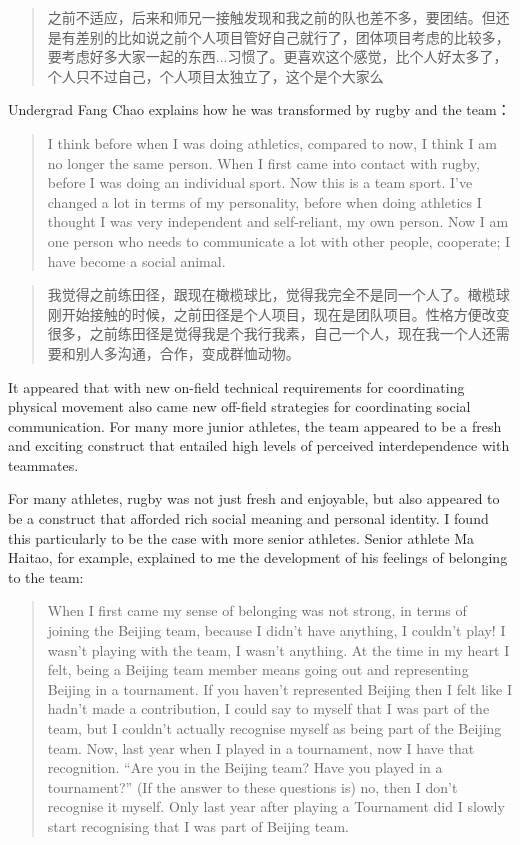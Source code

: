 \begin{CJK}{UTF8}{gbsn}
  \begin{quote}
    之前不适应，后来和师兄一接触发现和我之前的队也差不多，要团结。但还是有差别的比如说之前个人项目管好自己就行了，团体项目考虑的比较多，要考虑好多大家一起的东西...习惯了。更喜欢这个感觉，比个人好太多了，个人只不过自己，个人项目太独立了，这个是个大家么 \\
  \end{quote}

Undergrad Fang Chao explains how he was transformed by rugby and the team：

  \begin{quote}
    I think before when I was doing athletics, compared to now, I think I am no longer the same person.  When I first came into contact with rugby, before I was doing an individual sport.  Now this is a team sport. I've changed a lot in terms of my personality, before when doing athletics I thought I was very independent and self-reliant, my own person.  Now I am one person who needs to communicate a lot with other people, cooperate; I have become a social animal.
  \end{quote}

  \begin{quote}
    我觉得之前练田径，跟现在橄榄球比，觉得我完全不是同一个人了。橄榄球刚开始接触的时候，之前田径是个人项目，现在是团队项目。性格方便改变很多，之前练田径是觉得我是个我行我素，自己一个人，现在我一个人还需要和别人多沟通，合作，变成群恤动物。
  \end{quote}

It appeared that with new on-field technical requirements for coordinating physical movement also came new off-field strategies for coordinating social communication.  For many more junior athletes, the team appeared to be a fresh and exciting construct that entailed high levels of perceived interdependence with teammates.

For many athletes, rugby was not just fresh and enjoyable, but also appeared to be a construct that afforded rich social meaning and personal identity. I found this particularly to be the case with more senior athletes.  Senior athlete Ma Haitao, for example, explained to me the development of his feelings of belonging to the team:
    \begin{quote}
      When I first came my sense of belonging was not strong, in terms of joining the Beijing team, because I didn't have anything, I couldn't play! I wasn't playing with the team, I wasn't anything.  At the time in my heart I felt, being a Beijing team member means going out and representing Beijing in a tournament.  If you haven't represented Beijing then I felt like I hadn't made a contribution, I could say to myself that I was part of the team, but I couldn't actually recognise myself as being part of the Beijing team.  Now, last year when I played in a tournament, now I have that recognition. ``Are you in the Beijing team? Have you played in a tournament?'' (If the answer to these questions is) no, then I don't recognise it myself.  Only last year after playing a Tournament did I slowly start recognising that I was part of Beijing team.
    \end{quote}


\end{CJK}
